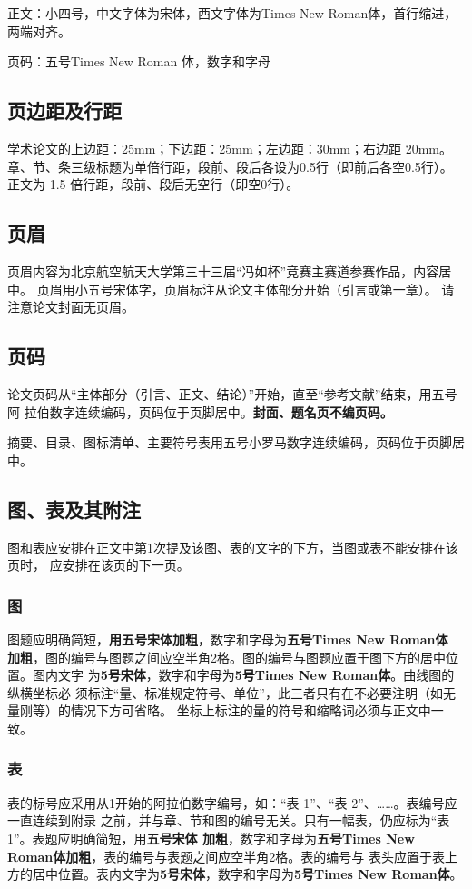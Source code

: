 \documentclass[zihao=-4]{ctexart}
\begin{document}
\begin{spacing}{1.5}
正文：小四号，中文字体为宋体，西文字体为Times New Roman体，首行缩进，两端对齐。

页码：五号Times New Roman 体，数字和字母\par

\subsection{页边距及行距}
学术论文的上边距：25mm；下边距：25mm；左边距：30mm；右边距 20mm。
章、节、条三级标题为单倍行距，段前、段后各设为0.5行（即前后各空0.5行）。
正文为 1.5 倍行距，段前、段后无空行（即空0行）。

\subsection{页眉}
页眉内容为北京航空航天大学第三十三届“冯如杯”竞赛主赛道参赛作品，内容居中。
页眉用小五号宋体字，页眉标注从论文主体部分开始（引言或第一章）。
请注意论文封面无页眉。

\subsection{页码}
论文页码从“主体部分（引言、正文、结论）”开始，直至“参考文献”结束，用五号阿
拉伯数字连续编码，页码位于页脚居中。\textbf{封面、题名页不编页码。}

摘要、目录、图标清单、主要符号表用五号小罗马数字连续编码，页码位于页脚居中。

\subsection{图、表及其附注}
图和表应安排在正文中第1次提及该图、表的文字的下方，当图或表不能安排在该页时，
应安排在该页的下一页。

\subsubsection{图}
图题应明确简短，\textbf{用五号宋体加粗}，数字和字母为\textbf{五号Times New Roman体
加粗}，图的编号与图题之间应空半角2格。图的编号与图题应置于图下方的居中位置。图内文字
为\textbf{5号宋体}，数字和字母为\textbf{5号Times New Roman体}。曲线图的纵横坐标必
须标注“量、标准规定符号、单位”，此三者只有在不必要注明（如无量刚等）的情况下方可省略。
坐标上标注的量的符号和缩略词必须与正文中一致。

\subsubsection{表}
表的标号应采用从1开始的阿拉伯数字编号，如：“表 1”、“表 2”、……。表编号应一直连续到附录
之前，并与章、节和图的编号无关。只有一幅表，仍应标为“表 1”。表题应明确简短，用\textbf{五号宋体
加粗}，数字和字母为\textbf{五号Times New Roman体加粗}，表的编号与表题之间应空半角2格。表的编号与
表头应置于表上方的居中位置。表内文字为\textbf{5号宋体}，数字和字母为\textbf{5号Times New Roman体}。  


\end{spacing}
\end{document}
